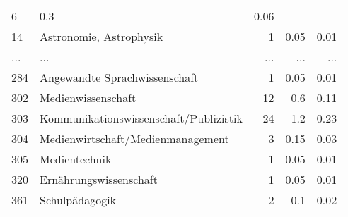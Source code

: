 \begin{longtable}{lXrrr}
          \num{6} &
          \num[round-mode=places,round-precision=2]{0,3} &
          \num[round-mode=places,round-precision=2]{0,06} \\
        14 & \multicolumn{1}{X}{Astronomie, Astrophysik} & %
          \num{1} &
          \num[round-mode=places,round-precision=2]{0,05} &
          \num[round-mode=places,round-precision=2]{0,01} \\
       ... & ... & ... & ... & ... \\
        284 & \multicolumn{1}{X}{Angewandte Sprachwissenschaft} & %
          \num{1} &
          \num[round-mode=places,round-precision=2]{0,05} &
          \num[round-mode=places,round-precision=2]{0,01} \\

        302 & \multicolumn{1}{X}{Medienwissenschaft} & %
          \num{12} &
          \num[round-mode=places,round-precision=2]{0,6} &
          \num[round-mode=places,round-precision=2]{0,11} \\

        303 & \multicolumn{1}{X}{Kommunikationswissenschaft/Publizistik} & %
          \num{24} &
          \num[round-mode=places,round-precision=2]{1,2} &
          \num[round-mode=places,round-precision=2]{0,23} \\

        304 & \multicolumn{1}{X}{Medienwirtschaft/Medienmanagement} & %
          \num{3} &
          \num[round-mode=places,round-precision=2]{0,15} &
          \num[round-mode=places,round-precision=2]{0,03} \\

        305 & \multicolumn{1}{X}{Medientechnik} & %
          \num{1} &
          \num[round-mode=places,round-precision=2]{0,05} &
          \num[round-mode=places,round-precision=2]{0,01} \\

        320 & \multicolumn{1}{X}{Ernährungswissenschaft} & %
          \num{1} &
          \num[round-mode=places,round-precision=2]{0,05} &
          \num[round-mode=places,round-precision=2]{0,01} \\

        361 & \multicolumn{1}{X}{Schulpädagogik} & %
          \num{2} &
          \num[round-mode=places,round-precision=2]{0,1} &
          \num[round-mode=places,round-precision=2]{0,02} \\


\end{longtable}
